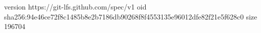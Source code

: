 version https://git-lfs.github.com/spec/v1
oid sha256:94e46ce72f8c1485b8e2b7186db90268f8f4553135e96012dfe82f21e5f628c0
size 196704
